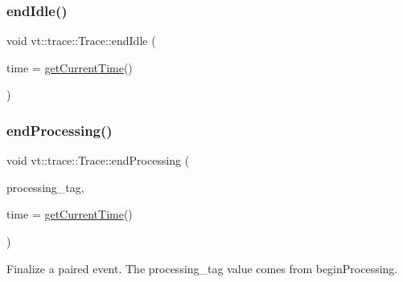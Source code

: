 \mbox{\label{structvt_1_1trace_1_1_trace_a0262f4025460c9d61cac60420e75ef77}} 
\subsubsection{\texorpdfstring{end\+Idle()}{endIdle()}}
{\footnotesize\ttfamily void vt\+::trace\+::\+Trace\+::end\+Idle (\begin{DoxyParamCaption}\item[{double const}]{time = {\ttfamily \hyperlink{structvt_1_1trace_1_1_trace_a04cf6b76b4ced1bc90d246a34c948db5}{get\+Current\+Time}()} }\end{DoxyParamCaption})}

\mbox{\label{structvt_1_1trace_1_1_trace_a679d11cc0cc8f783610a825200f899b4}} 
\subsubsection{\texorpdfstring{end\+Processing()}{endProcessing()}\hspace{0.1cm}{\footnotesize\ttfamily [1/2]}}
{\footnotesize\ttfamily void vt\+::trace\+::\+Trace\+::end\+Processing (\begin{DoxyParamCaption}\item[{\hyperlink{structvt_1_1trace_1_1_trace_processing_tag}{Trace\+Processing\+Tag}}]{processing\+\_\+tag,  }\item[{double const}]{time = {\ttfamily \hyperlink{structvt_1_1trace_1_1_trace_a04cf6b76b4ced1bc90d246a34c948db5}{get\+Current\+Time}()} }\end{DoxyParamCaption})}

Finalize a paired event. The processing\+\_\+tag value comes from begin\+Processing. \mbox{\label{structvt_1_1trace_1_1_trace_ad086d14a272d11f16b8eaead65bc685f}} 
